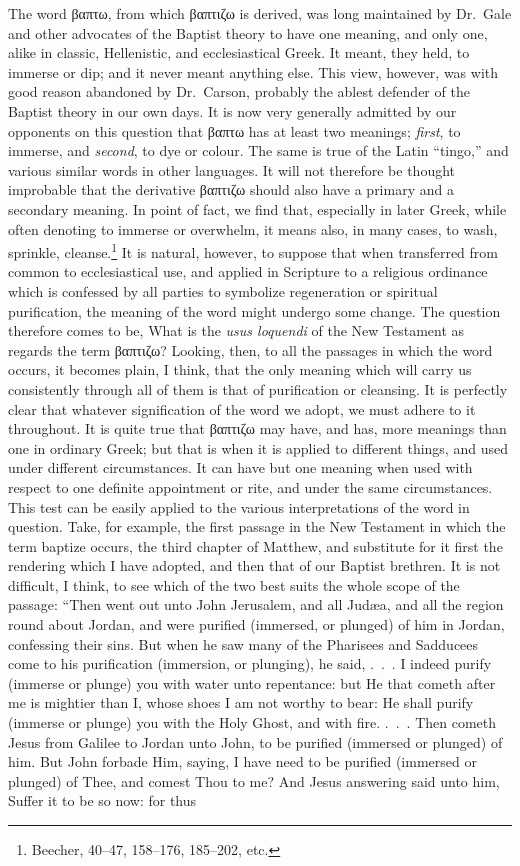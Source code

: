 \documentclass[
  english,
]{book}
\providecommand{\textlatin}{}
\renewcommand{\textlatin}[2][]{\foreignlanguage{latin}{#2}}
\newcommand{\textgreek}[2][]{\foreignlanguage{greek}{#2}}
\begin{document}
The word \textgreek{βαπτω}, from which \textgreek{βαπτιζω} is derived, was long maintained by Dr.~Gale and other advocates of the Baptist theory to have one meaning, and only one, alike in classic, Hellenistic, and ecclesiastical Greek. It meant, they held, to immerse or dip; and it never meant anything else. This view, however, was with good reason abandoned by Dr.~Carson, probably the ablest defender of the Baptist theory in our own days. It is now very generally admitted by our opponents on this question that \textgreek{βαπτω} has at least two meanings; \emph{first}, to immerse, and \emph{second}, to dye or colour. The same is true of the Latin ``\textlatin{tingo},'' and various similar words in other languages. It will not therefore be thought improbable that the derivative \textgreek{βαπτιζω} should also have a primary and a secondary meaning. In point of fact, we find that, especially in later Greek, while often denoting to immerse or overwhelm, it means also, in many cases, to wash, sprinkle, cleanse.\footnote{Beecher, 40--47, 158--176, 185--202, etc.} It is natural, however, to suppose that when transferred from common to ecclesiastical use, and applied in Scripture to a religious ordinance which is confessed by all parties to symbolize regeneration or spiritual purification, the meaning of the word might undergo some change. The question therefore comes to be, What is the \textlatin{\emph{usus loquendi}} of the New Testament as regards the term \textgreek{βαπτιζω}? Looking, then, to all the passages in which the word occurs, it becomes plain, I think, that the only meaning which will carry us consistently through all of them is that of purification or cleansing. It is perfectly clear that whatever signification of the word we adopt, we must adhere to it throughout. It is quite true that \textgreek{βαπτιζω} may have, and has, more meanings than one in ordinary Greek; but that is when it is applied to different things, and used under different circumstances. It can have but one meaning when used with respect to one definite appointment or rite, and under the same circumstances. This test can be easily applied to the various interpretations of the word in question. Take, for example, the first passage in the New Testament in which the term baptize occurs, the third chapter of Matthew, and substitute for it first the rendering which I have adopted, and then that of our Baptist brethren. It is not difficult, I think, to see which of the two best suits the whole scope of the passage: ``Then went out unto John Jerusalem, and all Judæa, and all the region round about Jordan, and were purified (immersed, or plunged) of him in Jordan, confessing their sins. But when he saw many of the Pharisees and Sadducees come to his purification (immersion, or plunging), he said, .~.~. I indeed purify (immerse or plunge) you with water unto repentance: but He that cometh after me is mightier than I, whose shoes I am not worthy to bear: He shall purify (immerse or plunge) you with the Holy Ghost, and with fire. .~.~. Then cometh Jesus from Galilee to Jordan unto John, to be purified (immersed or plunged) of him. But John forbade Him, saying, I have need to be purified (immersed or plunged) of Thee, and comest Thou to me? And Jesus answering said unto him, Suffer it to be so now: for thus 
\end{document}

